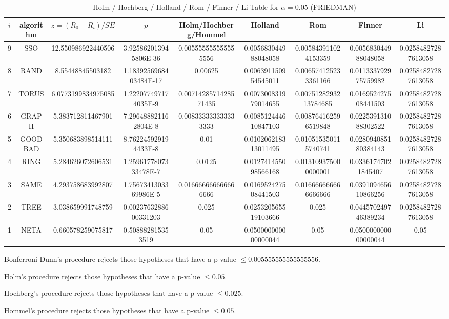\documentclass[a4paper,10pt]{article}
\begin{document}
\begin{landscape}
\begin{table}[!htp]
\centering\scriptsize
\caption{Holm / Hochberg / Holland / Rom / Finner / Li Table for $\alpha=0.05$ (FRIEDMAN)}
\begin{tabular}{ccccccccc}
$i$&algorithm&$z=(R_0 - R_i)/SE$&$p$&Holm/Hochberg/Hommel&Holland&Rom&Finner&Li\\
\hline
9& SSO&12.550986922440506&3.925862013945806E-36&0.005555555555555556&0.005683044988048058&0.005843911024153359&0.005683044988048058&0.02584827287613058\\
8& RAND&8.55448845503182&1.1839256968403484E-17&0.00625&0.006391150954545011&0.006574125233361166&0.011333792975759982&0.02584827287613058\\
7& TORUS&6.0773199834975085&1.222077497174035E-9&0.0071428571428571435&0.007300831979014655&0.0075128293213784685&0.016952427508441503&0.02584827287613058\\
6& GRAPH&5.383712811467901&7.296488821162804E-8&0.008333333333333333&0.008512444610847103&0.008764162596519848&0.022539131088302522&0.02584827287613058\\
5& GOODBAD&5.350683898514111&8.762245929194433E-8&0.01&0.010206218313011495&0.010515350115740741&0.028094085180384143&0.02584827287613058\\
4& RING&5.284626072606531&1.2596177807333478E-7&0.0125&0.012741455098566168&0.013109375000000001&0.03361747021845407&0.02584827287613058\\
3& SAME&4.293758683992807&1.7567341303369986E-5&0.016666666666666666&0.016952427508441503&0.016666666666666666&0.039109465610866256&0.02584827287613058\\
2& TREE&3.038659991748759&0.0023763288600331203&0.025&0.025320565519103666&0.025&0.044570249746389234&0.02584827287613058\\
1& NETA&0.660578259075817&0.508882815353519&0.05&0.050000000000000044&0.05&0.050000000000000044&0.05\\
\hline
\end{tabular}
\end{table}
Bonferroni-Dunn's procedure rejects those hypotheses that have a p-value $\le0.005555555555555556$.


Holm's procedure rejects those hypotheses that have a p-value $\le0.05$.


Hochberg's procedure rejects those hypotheses that have a p-value $\le0.025$.


Hommel's procedure rejects those hypotheses that have a p-value $\le0.05$.



\end{landscape}
\end{document}
